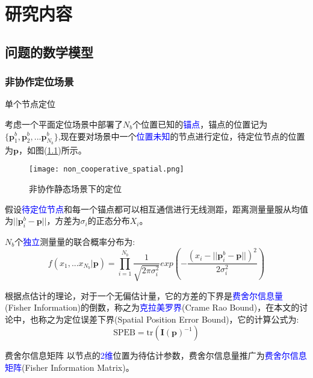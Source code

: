 \chapter{研究内容}
\label{cha:content}

\section{问题的数学模型}

\subsection[非协作定位场景]{非协作定位场景}

{单个节点定位}

        考虑一个平面定位场景中部署了$N_b$个位置已知的\textcolor{blue}{锚点}，锚点的位置记为$\{\bm{p}^b_1,\bm{p}^b_2,...\bm{p}^b_{N_b}\}$,现在要对场景中一个\textcolor{blue}{位置未知}的节点进行定位，待定位节点的位置为$\bm{p}$，如图(\ref{fig:non_cooperative_spatial})所示。
        \begin{figure}
          \centering
          \texttt{[image: non\_cooperative\_spatial.png]}
          \caption{非协作静态场景下的定位}\label{fig:non_cooperative_spatial}
        \end{figure}
假设\textcolor{blue}{待定位节点}和每一个锚点都可以相互通信进行无线测距，距离测量量服从均值为$||\bm{p}^b_i-\bm{p}||$，方差为$\sigma_i$的正态分布$X_i$。

$N_b$个\textcolor{blue}{独立}测量量的联合概率分布为:
\begin{equation}\label{eq:single}
f(x_1,...x_{N_b}|\textbf{p})=\prod_{i=1}^{N_b}\frac{1}{\sqrt{2\pi\sigma_i^2}}exp(-\frac{(x_i-||\bm{p}^b_i-\bm{p}||)^2}{2\sigma_i^2})
\end{equation}

根据点估计的理论，对于一个无偏估计量，它的方差的下界是\textcolor{blue}{费舍尔信息量}(Fisher Information)的倒数，称之为\textcolor{blue}{克拉美罗界}(Crame Rao Bound)，在本文的讨论中，也称之为定位误差下界(Spatial Position Error Bound)，它的计算公式为:
\begin{equation}\label{eq:SPEB_formula}
  \text{SPEB}=\text{tr}(\bm{I(\bm{p})}^{-1})
\end{equation}


{费舍尔信息矩阵}
以节点的\textcolor{blue}{2维}位置为待估计参数，费舍尔信息量推广为\textcolor{blue}{费舍尔信息矩阵}(Fisher Information Matrix)。

